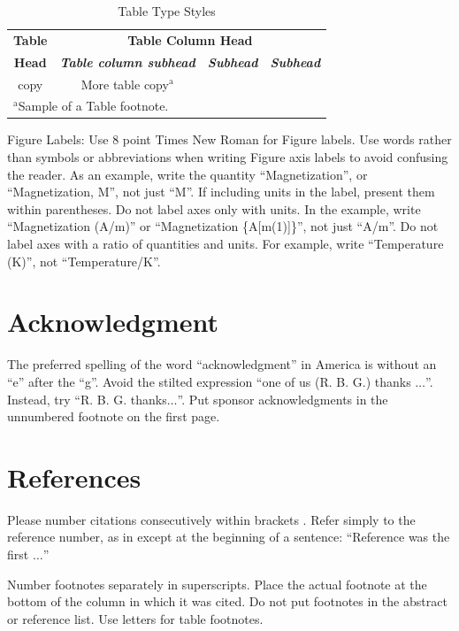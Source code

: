 \documentclass[conference]{IEEEtran}
\begin{document}
\begin{table}[htbp]
\caption{Table Type Styles}
\begin{center}
\begin{tabular}{|c|c|c|c|}
\hline
\textbf{Table}&\multicolumn{3}{|c|}{\textbf{Table Column Head}} \\
\cline{2-4} 
\textbf{Head} & \textbf{\textit{Table column subhead}}& \textbf{\textit{Subhead}}& \textbf{\textit{Subhead}} \\
\hline
copy& More table copy$^{\mathrm{a}}$& &  \\
\hline
\multicolumn{4}{l}{$^{\mathrm{a}}$Sample of a Table footnote.}
\end{tabular}
\label{tab1}
\end{center}
\end{table}

Figure Labels: Use 8 point Times New Roman for Figure labels. Use words 
rather than symbols or abbreviations when writing Figure axis labels to 
avoid confusing the reader. As an example, write the quantity 
``Magnetization'', or ``Magnetization, M'', not just ``M''. If including 
units in the label, present them within parentheses. Do not label axes only 
with units. In the example, write ``Magnetization (A/m)'' or ``Magnetization 
\{A[m(1)]\}'', not just ``A/m''. Do not label axes with a ratio of 
quantities and units. For example, write ``Temperature (K)'', not 
``Temperature/K''.

\section*{Acknowledgment}

The preferred spelling of the word ``acknowledgment'' in America is without 
an ``e'' after the ``g''. Avoid the stilted expression ``one of us (R. B. 
G.) thanks $\ldots$''. Instead, try ``R. B. G. thanks$\ldots$''. Put sponsor 
acknowledgments in the unnumbered footnote on the first page.

\section*{References}

Please number citations consecutively within brackets . Refer simply to the reference 
number, as in  except at 
the beginning of a sentence: ``Reference was the first $\ldots$''

Number footnotes separately in superscripts. Place the actual footnote at 
the bottom of the column in which it was cited. Do not put footnotes in the 
abstract or reference list. Use letters for table footnotes.
\end{document}
